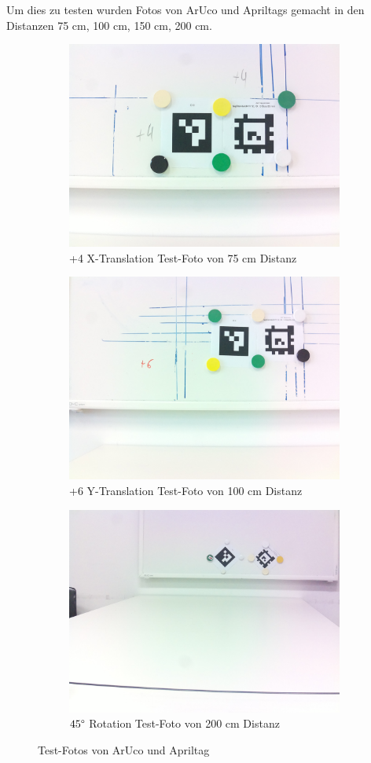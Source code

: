 Um dies zu testen wurden Fotos von ArUco und Apriltags gemacht in den Distanzen 75 cm, 100 cm, 150 cm, 200 cm.
\begin{figure}[H]
    \centering
    \begin{subfigure}[h]{0.5\textwidth}
        \includegraphics[width=0.5\linewidth]{graphics/75_xtranslate.jpg}
        \caption{+4 X-Translation Test-Foto von 75 cm Distanz}
        \label{fig:Test75}
    \end{subfigure}
    \begin{subfigure}[h]{0.5\textwidth}
        \includegraphics[width=0.5\linewidth]{graphics/100_ytranslate.jpg}
        \caption{+6 Y-Translation Test-Foto von 100 cm Distanz}
        \label{fig:Test100}
    \end{subfigure}
    \begin{subfigure}[h]{0.5\textwidth}
        \includegraphics[width=0.5\linewidth]{graphics/200_rotation.jpg}
        \caption{\(45\degree\) Rotation Test-Foto von 200 cm Distanz}
        \label{fig:Test200}
    \end{subfigure}
    
    \caption{Test-Fotos von ArUco und Apriltag}
\label{fig:TestFotos}
\end{figure}

